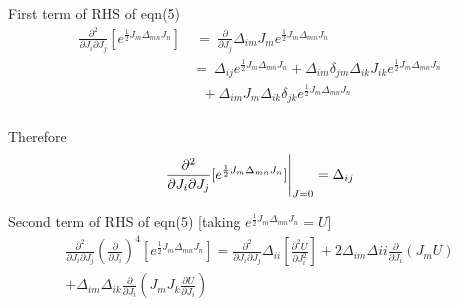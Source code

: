 \documentclass[12pt, letterpaper]{article}
\newcommand*{\1}{\hspace{1pt}}
\begin{document}
    First term of RHS of eqn(5)
    \begin{align}
        \frac{\partial ^{2}}{\partial J_{i} \partial J_{j}} [e^{\frac{1}{2} J_{m} \Delta _{mn} J_{n}}] &  \ = \  \frac{\partial}{\partial J_{j}} \Delta_{im} J_{m} e^{\frac{1}{2}J_{m}\Delta_{mn} J_{n}} \\
         & = \ \Delta_{ij} e^{\frac{1}{2} J_{m} \Delta_{mn} J_{n}} + \Delta_{im} \delta_{jm} \Delta_{ik} J_{ik} e^{\frac{1}{2} J_{m} \Delta _{mn} J_{n}} \\
         & \ \ \  + \Delta_{im} J_{m}\Delta_{ik} \delta_{jk} e^{\frac{1}{2} J_{m} \Delta _{mn} J_{n}} \\
    \end{align}
    
    Therefore
    \begin{equation}
        \frac{\partial ^{2}}{\partial J_{i} \partial J_{j}} [e^{\frac{1}{2} J_{m} \Delta _{mn} J_{n}}]  \Biggr|_{J=0} = \Delta_{ij} \\
    \end{equation}

    Second term of RHS of eqn(5) [taking $e^{\frac{1}{2}J_{m}\Delta_{mn} J_{n}} = U$]
    \begin{equation}
    \begin{split}
        \frac{\partial ^{2}}{\partial J_{i} \partial J_{j}}(\frac{\partial}{\partial J_{i}})^{4} [e^{\frac{1}{2} J_{m} \Delta _{mn} J_{n}}] =   \frac{\partial ^{2}}{\partial J_{i} \partial J_{j}} \Delta_{ii} [\frac{\partial ^{2} U}{{\partial J_{i}^2}}] + 2\Delta_{im}\Delta{ii}\frac{\partial}{\partial J_{i}}(J_{m} U) \\
         + \Delta_{im}\Delta_{ik}\frac{\partial}{\partial J_{i}}(J_{m}J_{k}\frac{\partial U}{\partial J_{i}}) \\ 
    \end{split}
    \end{equation}
    
\end{document}
